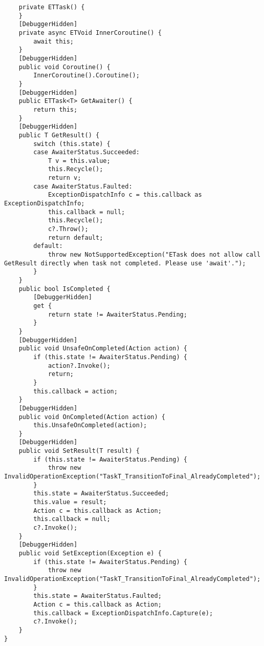 \documentclass[9pt, b5paper]{article}
\begin{document}
\begin{itemize}
\begin{verbatim}
    private ETTask() {
    }
    [DebuggerHidden]
    private async ETVoid InnerCoroutine() {
        await this;
    }
    [DebuggerHidden]
    public void Coroutine() {
        InnerCoroutine().Coroutine();
    }
    [DebuggerHidden]
    public ETTask<T> GetAwaiter() {
        return this;
    }
    [DebuggerHidden]
    public T GetResult() {
        switch (this.state) {
        case AwaiterStatus.Succeeded:
            T v = this.value;
            this.Recycle();
            return v;
        case AwaiterStatus.Faulted:
            ExceptionDispatchInfo c = this.callback as ExceptionDispatchInfo;
            this.callback = null;
            this.Recycle();
            c?.Throw();
            return default;
        default:
            throw new NotSupportedException("ETask does not allow call GetResult directly when task not completed. Please use 'await'.");
        }
    }
    public bool IsCompleted {
        [DebuggerHidden]
        get {
            return state != AwaiterStatus.Pending;
        }
    } 
    [DebuggerHidden]
    public void UnsafeOnCompleted(Action action) {
        if (this.state != AwaiterStatus.Pending) {
            action?.Invoke();
            return;
        }
        this.callback = action;
    }
    [DebuggerHidden]
    public void OnCompleted(Action action) {
        this.UnsafeOnCompleted(action);
    }
    [DebuggerHidden]
    public void SetResult(T result) {
        if (this.state != AwaiterStatus.Pending) {
            throw new InvalidOperationException("TaskT_TransitionToFinal_AlreadyCompleted");
        }
        this.state = AwaiterStatus.Succeeded;
        this.value = result;
        Action c = this.callback as Action;
        this.callback = null;
        c?.Invoke();
    }
    [DebuggerHidden]
    public void SetException(Exception e) {
        if (this.state != AwaiterStatus.Pending) {
            throw new InvalidOperationException("TaskT_TransitionToFinal_AlreadyCompleted");
        }
        this.state = AwaiterStatus.Faulted;
        Action c = this.callback as Action;
        this.callback = ExceptionDispatchInfo.Capture(e);
        c?.Invoke();
    }
}
\end{verbatim}
\end{itemize}
\end{document}
